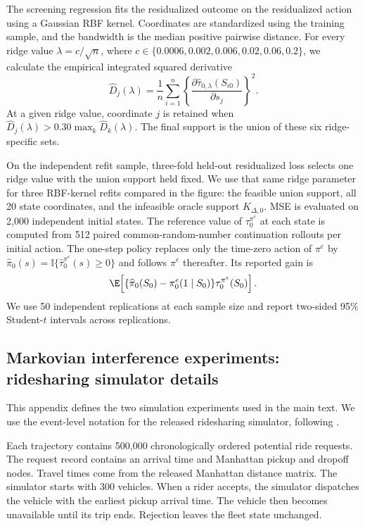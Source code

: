 \documentclass[opre,nonblindrev]{informs4}
\newenvironment{revision}{\begingroup\color{revisionblue}\ignorespaces}{\endgroup}
\newcommand{\blipadv}{\tau}
\begin{document}
\begin{revision}
The screening regression fits the residualized outcome on the residualized
action using a Gaussian RBF kernel. Coordinates are standardized using the
training sample, and the bandwidth is the median positive pairwise distance.
For every ridge value $\lambda=c/\sqrt n$, where $c\in\{0.0006,0.002,0.006,0.02,0.06,0.2\}$,
we calculate the empirical integrated squared derivative
\[
 \widehat D_j(\lambda)
 =\frac{1}{n}\sum_{i=1}^n
 \left\{
 \frac{\partial\widehat\blipadv_{0,\lambda}(S_{i0})}
 {\partial s_j}
 \right\}^2.
\]
At a given ridge value, coordinate $j$ is retained when
$\widehat D_j(\lambda)>0.30\max_k\widehat D_k(\lambda)$. The final support is
the union of these six ridge-specific sets. 

On the independent refit sample, three-fold held-out residualized loss selects
one ridge value with the union support held fixed. We use that same ridge parameter for
three RBF-kernel refits compared in the figure: the feasible union support, all 20 state coordinates,
and the infeasible oracle support $K_{\Delta,0}$. MSE is evaluated on 2,000
independent initial states. The reference value of
$\blipadv_0^{\pi^e}$ at each state is computed from 512 paired
common-random-number continuation rollouts per initial action. The one-step
policy replaces only the time-zero action of $\pi^e$ by
$\widehat\pi_0(s)=\mathbb I\{\widehat\blipadv_0^{\pi^e}(s)\geq0\}$ and follows
$\pi^e$ thereafter. Its reported gain is
\[
 \E\!\left[
 \{\widehat\pi_0(S_0)-\pi_0^e(1\mid S_0)\}
 \blipadv_0^{\pi^e}(S_0)
 \right].
\]
We use 50 independent replications at each sample size and report two-sided
95\% Student-$t$ intervals across replications.

\subsection{Markovian interference experiments: ridesharing simulator details}\label{app:dgp}

This appendix defines the two simulation experiments used in the main text.
We use the event-level notation for the released ridesharing simulator,
following \citet{johari2025estimation}.

Each trajectory contains 500,000 chronologically ordered potential ride
requests. The request record contains an arrival time and Manhattan pickup and
dropoff nodes. Travel times come from the released Manhattan distance matrix.
The simulator starts with 300 vehicles. When a rider accepts, the simulator
dispatches the vehicle with the earliest pickup arrival time. The vehicle then
becomes unavailable until its trip ends. Rejection leaves the fleet state
unchanged.


\end{revision}
\end{document}
